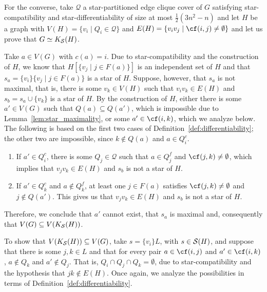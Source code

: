 \begin{tproof}
    For the converse, take $\mathcal{Q}$ a star-partitioned edge clique cover of $G$ satisfying star-compatibility and star-differentiability  of size at most $\frac{1}{2}(3n^2 - n)$ and let $H$ be a graph with $V(H) = \{v_i \mid Q_i \in \mathcal{Q}\}$ and $E(H) = \{v_iv_j \mid \cf(i,j) \neq \emptyset\}$ and let us prove that $G \simeq K_{\mathcal{S}}(H)$.
    
    Take $a \in V(G)$ with $c(a) = i$.
    Due to star-compatibility and the construction of $H$, we know that $H[\{v_j \mid j \in F(a)\}]$ is an independent set of $H$ and that $s_a = \{v_i\}\{v_j \mid j \in F(a)\}$ is a star of $H$.
    Suppose, however, that $s_a$ is not maximal, that is, there is some $v_k \in V(H)$ such that $v_iv_k \in E(H)$ and $s_b = s_a \cup \{v_k\}$ is a star of $H$.
    By the construction of $H$, either there is some $a' \in V(G)$ such that $Q(a) \subseteq Q(a')$, which is impossible due to Lemma~\ref{lem:star_maximality}, or some $a' \in \cf(i,k)$, which we analyze below.
    The following is based on the first two cases of Definition~\ref{def:differentiability}; the other two are impossible, since $k \notin Q(a)$ and $a \in Q_i^c$.
    
    \begin{enumerate}
        \item If $a' \in Q_i^c$, there is some $Q_j \in \mathcal{Q}$ such that $a \in Q_j^f$ and $\cf(j,k) \neq \emptyset$, which implies that $v_jv_k \in E(H)$ and $s_b$ is not a star of $H$. 
        \item If $a' \in Q_k^c$ and $a \notin Q_k^f$, at least one $j \in F(a)$ satisfies $\cf(j,k) \neq \emptyset$ and $j \notin Q(a')$.
        This gives us that $v_jv_k \in E(H)$ and $s_b$ is not a star of $H$.
    \end{enumerate}
    
    Therefore, we conclude that $a'$ cannot exist, that $s_a$ is maximal and, consequently that $V(G) \subseteq V(K_{\mathcal{S}}(H))$.
    
    To show that $V(K_{\mathcal{S}}(H)) \subseteq V(G)$, take $s = \{v_i\}L$, with $s \in \mathcal{S}(H)$, and suppose that there is some $j,k \in L$ and that for every pair $a \in \cf(i,j)$ and $a' \in \cf(i,k)$, $a \notin Q_k$ and $a' \notin Q_j$.
    That is, $Q_i \cap Q_j \cap Q_k = \emptyset$, due to star-compatibility and the hypothesis that $jk \notin E(H)$.
    Once again, we analyze the possibilities in terms of Definition~\ref{def:differentiability}.
    

\end{tproof}
